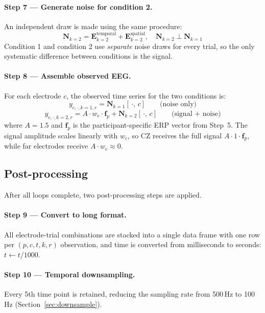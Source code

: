 \documentclass[12pt, a4paper]{article}
\begin{document}
\paragraph{Step 7 --- Generate noise for condition 2.}
An independent draw is made using the same procedure:
\[
  \mathbf{N}_{k=2} = \mathbf{E}^\text{temporal}_{k=2}
                   + \mathbf{E}^\text{spatial}_{k=2},
  \quad \mathbf{N}_{k=2} \perp \mathbf{N}_{k=1}
\]
Condition 1 and condition 2 use \emph{separate} noise draws for every
trial, so the only systematic difference between conditions is the signal.

\paragraph{Step 8 --- Assemble observed EEG.}
For each electrode $c$, the observed time series for the two conditions is:
\begin{equation}\label{eq:assemble}
  y_{c,\cdot,k=1,r} = \mathbf{N}_{k=1}[\,\cdot,\, c]
  \qquad \text{(noise only)}
\end{equation}
\begin{equation}
  y_{c,\cdot,k=2,r} = A \cdot w_c \cdot \mathbf{f}_p
                     + \mathbf{N}_{k=2}[\,\cdot,\, c]
  \qquad \text{(signal + noise)}
\end{equation}
where $A = 1.5$ and $\mathbf{f}_p$ is the participant-specific ERP vector
from Step~5. The signal amplitude scales linearly with $w_c$, so CZ
receives the full signal $A \cdot 1 \cdot \mathbf{f}_p$, while far
electrodes receive $A \cdot w_c \approx 0$.

\subsection{Post-processing}\label{sec:postproc}

After all loops complete, two post-processing steps are applied.

\paragraph{Step 9 --- Convert to long format.}
All electrode-trial combinations are stacked into a single data frame with
one row per $(p, c, t, k, r)$ observation, and time is converted from
milliseconds to seconds: $t \leftarrow t / 1000$.

\paragraph{Step 10 --- Temporal downsampling.}
Every 5th time point is retained, reducing the sampling rate from
500\,Hz to 100\,Hz (Section~\ref{sec:downsample}).
\end{document}
